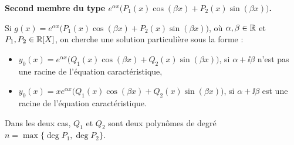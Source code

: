 \documentclass[class=report,crop=false]{standalone}
\begin{document}
\bigskip

\textbf{Second membre du type $e^{\alpha x}\big(P_1(x)\cos (\beta x)+P_2(x)\sin (\beta x)\big)$.}

Si $g(x)=e^{\alpha x} \big(P_1(x)\cos (\beta x)+P_2(x)\sin (\beta x)\big)$,
où $\alpha ,\beta \in \mathbb{R}$ et $P_1,P_2\in\mathbb{R}[X]$, on cherche une solution particulière sous la forme :
\begin{itemize}
\item $y_0(x)=e^{\alpha x} \big( Q_1(x)\cos (\beta x)+Q_2(x)\sin (\beta x) \big)$,
si $\alpha +\ii \beta$ n'est pas une racine de l'équation caractéristique,

\item $y_0(x)=xe^{\alpha x}  \big( Q_1(x)\cos (\beta x)+Q_2(x)\sin (\beta x) \big)$,
si $\alpha +\ii \beta$ est une racine de l'équation caractéristique.
\end{itemize}
Dans les deux cas, $Q_1$ et $Q_2$ sont deux polynômes
de degré $n=\max\{\deg P_1,\deg P_2\}$.
\end{document}
